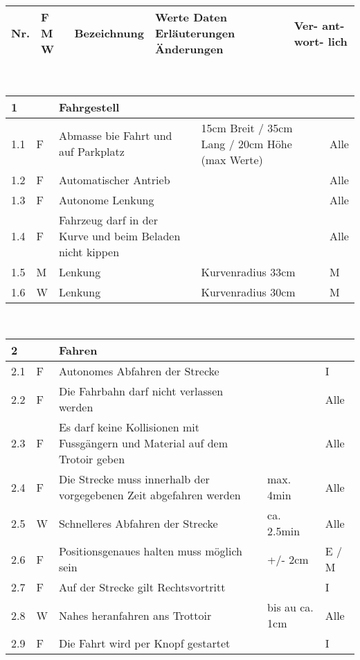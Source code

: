 \begin{center}
\begin{tabular}{|p{1cm}|p{0.5cm}|p{5cm}|p{5cm}|p{1.5cm}|}\hline
\textbf{Nr.} & \textbf{F M W} & \textbf{Bezeichnung} & \textbf{Werte Daten Erläuterungen Änderungen} & \textbf{Ver- ant- wort- lich}\\\hline
\end{tabular}\\[0.3cm]
\begin{tabular}{|p{1cm}|p{0.5cm}|p{5cm}|p{5cm}|p{1.5cm}|}\hline
 \textbf{1} & & \textbf{Fahrgestell} & & \\\hline
 1.1 & F & Abmasse bie Fahrt und auf Parkplatz & 15cm Breit / 35cm Lang / 20cm Höhe (max Werte) & Alle\\ \hline
 1.2 & F & Automatischer Antrieb & & Alle\\\hline
 1.3 & F & Autonome Lenkung & & Alle\\\hline
 1.4 & F & Fahrzeug darf in der Kurve und beim Beladen nicht kippen & & Alle \\\hline
 1.5 & M & Lenkung & Kurvenradius 33cm & M \\\hline
 1.6 & W & Lenkung & Kurvenradius 30cm & M \\\hline
\end{tabular}\\[0.3cm]
\begin{tabular}{|p{1cm}|p{0.5cm}|p{5cm}|p{5cm}|p{1.5cm}|}\hline
 \textbf{2} & & \textbf{Fahren} & & \\\hline
 2.1 & F & Autonomes Abfahren der Strecke & & I\\\hline
 2.2 & F & Die Fahrbahn darf nicht verlassen werden & & Alle\\\hline
 2.3 & F & Es darf keine Kollisionen mit Fussgängern und Material auf dem Trotoir geben & & Alle \\\hline
 2.4 & F & Die Strecke muss innerhalb der vorgegebenen Zeit abgefahren werden & max. 4min & Alle\\\hline
 2.5 & W & Schnelleres Abfahren der Strecke & ca. 2.5min & Alle\\\hline
 2.6 & F & Positionsgenaues halten muss möglich sein & +/- 2cm & E / M\\\hline
 2.7 & F & Auf der Strecke gilt Rechtsvortritt & & I \\\hline
 2.8 & W & Nahes heranfahren ans Trottoir & bis au ca. 1cm & Alle\\\hline
 2.9 & F & Die Fahrt wird per Knopf gestartet & & I\\\hline

\end{tabular}
\end{center}
